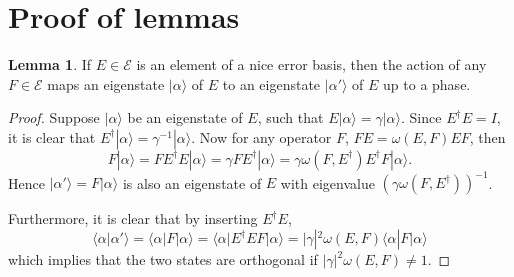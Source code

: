 \documentclass[a4paper,11pt]{article}
\theoremstyle{definition}
\newtheorem{lemma}{Lemma}[section]
\numberwithin{equation}{section}
\begin{document}
\appendix
\section{Proof of lemmas}\label{app:1}
\begin{lemma}\label{lemma:1}
If $E\in \mathcal{E}$ is an element of a nice error basis, then the action of any $F\in\mathcal{E}$ maps an eigenstate $|\alpha\rangle$ of $E$ to an eigenstate $|\alpha'\rangle$ of $E$ up to a phase. 
\end{lemma}

\begin{proof}
Suppose $|\alpha\rangle$ be an eigenstate of $E$, such that $E|\alpha\rangle = \gamma |\alpha\rangle$. Since $E^{\dagger}E=I$, it is clear that $E^{\dagger}|\alpha\rangle = \gamma^{-1}|\alpha\rangle$. Now for any operator $F$, $FE=\omega(E,F) EF$, then 
$$F|\alpha\rangle=FE^{\dagger}E|\alpha\rangle=\gamma FE^{\dagger}|\alpha\rangle = \gamma \omega(F,E^{\dagger}) E^{\dagger}F|\alpha\rangle.$$ 
Hence $|\alpha'\rangle=F|\alpha\rangle$ is also an eigenstate of $E$ with eigenvalue $(\gamma\omega(F,E^{\dagger}))^{-1}$. 

Furthermore, it is clear that by inserting $E^{\dagger}E$, $$\langle\alpha|\alpha'\rangle=\langle\alpha|F|\alpha\rangle=\langle\alpha|E^{\dagger}EF|\alpha\rangle = |\gamma|^2 \omega(E,F)\langle\alpha|F|\alpha\rangle$$ which implies that the two states are orthogonal if $|\gamma|^2\omega(E,F)\ne 1$. 
\end{proof}
\end{document}
